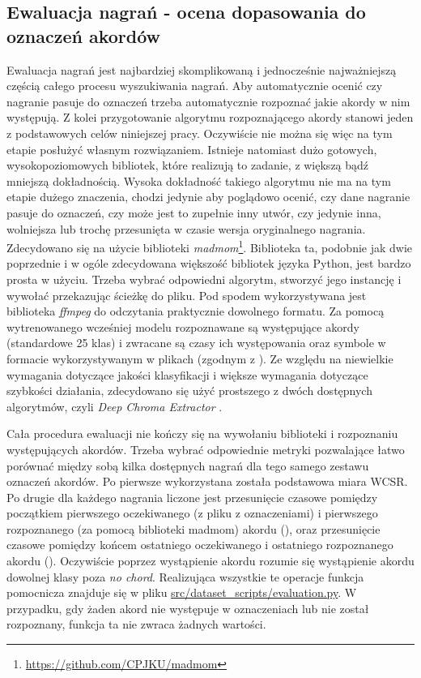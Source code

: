 \subsection{Ewaluacja nagrań - ocena dopasowania do oznaczeń akordów}
Ewaluacja nagrań jest najbardziej skomplikowaną i jednocześnie najważniejszą częścią całego procesu wyszukiwania nagrań. Aby automatycznie ocenić czy nagranie pasuje do oznaczeń trzeba automatycznie rozpoznać jakie akordy w nim występują. Z kolei przygotowanie algorytmu rozpoznającego akordy stanowi jeden z podstawowych celów niniejszej pracy. Oczywiście nie można się więc na tym etapie posłużyć własnym rozwiązaniem. Istnieje natomiast dużo gotowych, wysokopoziomowych bibliotek, które realizują to zadanie, z większą bądź mniejszą dokładnością. Wysoka dokładność takiego algorytmu nie ma na tym etapie dużego znaczenia, chodzi jedynie aby poglądowo ocenić, czy dane nagranie pasuje do oznaczeń, czy może jest to zupełnie inny utwór, czy jedynie inna, wolniejsza lub trochę przesunięta w czasie wersja oryginalnego nagrania. Zdecydowano się na użycie biblioteki \emph{madmom}\footnote{\url{https://github.com/CPJKU/madmom}}.  Biblioteka ta, podobnie jak dwie poprzednie i w ogóle zdecydowana większość bibliotek języka Python, jest bardzo prosta w użyciu. Trzeba wybrać odpowiedni algorytm, stworzyć jego instancję i wywołać przekazując ścieżkę do pliku. Pod spodem wykorzystywana jest biblioteka \emph{ffmpeg} do odczytania praktycznie dowolnego formatu. Za pomocą wytrenowanego wcześniej modelu rozpoznawane są występujące akordy (standardowe 25 klas) i zwracane są czasy ich występowania oraz symbole w formacie wykorzystywanym w plikach  (zgodnym z \cite{harte_towards_nodate}). Ze względu na niewielkie wymagania dotyczące jakości klasyfikacji i większe wymagania dotyczące szybkości działania, zdecydowano się użyć prostszego z dwóch dostępnych algorytmów, czyli \emph{Deep Chroma Extractor} \cite{korzeniowski_feature_2016}.

Cała procedura ewaluacji nie kończy się na wywołaniu biblioteki i rozpoznaniu występujących akordów.  Trzeba wybrać odpowiednie metryki pozwalające łatwo porównać między sobą kilka dostępnych nagrań dla tego samego zestawu oznaczeń akordów. Po pierwsze wykorzystana została podstawowa miara WCSR. Po drugie dla każdego nagrania liczone jest przesunięcie czasowe pomiędzy początkiem pierwszego oczekiwanego (z pliku z oznaczeniami) i pierwszego rozpoznanego (za pomocą biblioteki madmom) akordu (), oraz przesunięcie czasowe pomiędzy końcem ostatniego oczekiwanego i ostatniego rozpoznanego akordu (). Oczywiście poprzez wystąpienie akordu rozumie się wystąpienie akordu dowolnej klasy poza \emph{no chord}. Realizująca wszystkie te operacje funkcja pomocnicza znajduje się w pliku \url{src/dataset_scripts/evaluation.py}. W przypadku, gdy żaden akord nie występuje w oznaczeniach lub nie został rozpoznany, funkcja ta nie zwraca żadnych wartości.

